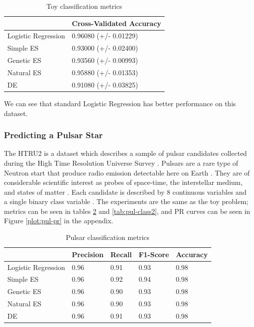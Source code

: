 \documentclass[conference]{IEEEtran}
\begin{document}
\begin{table}[htbp]
\centering
\begin{tabular}{ll}
\hline
 & Cross-Validated Accuracy \\ \hline
Logistic Regression & 0.96080 (+/- 0.01229) \\
Simple ES & 0.93000 (+/- 0.02400) \\
Genetic ES & 0.93560 (+/- 0.00993) \\
Natural ES & 0.95880 (+/- 0.01353) \\
DE & 0.91080 (+/- 0.03825) \\ \hline
\end{tabular}
\caption{Toy classification metrics}
\label{tab:toy-class2}
\end{table}

We can see that standard Logistic Regression has better performance on this dataset.

\subsubsection{Predicting a Pulsar Star}
The HTRU2 is a dataset which describes a sample of pulsar candidates collected during the High Time Resolution Universe Survey \cite{pulsar}. 
Pulsars are a rare type of Neutron start that produce radio emission detectable here on Earth \cite{pulsar}. They are of considerable scientific 
interest as probes of space-time, the interstellar medium, and states of matter \cite{pulsar}. Each candidate is described by $8$ continuous 
variables and a single binary class variable \cite{pulsar}. The experiments are the same as the toy problem; metrics can be seen in tables 
\ref{tab:pul-class1} and \ref{tab:pul-class2}, and PR curves can be seen in Figure \ref{plot:pul-pr} in the appendix.

\begin{table}[htbp]
\centering
\begin{tabular}{@{}lllll@{}}
\toprule
 & Precision & Recall & F1-Score & Accuracy \\ \midrule
Logistic Regression & \cellcolor[HTML]{C0C0C0}0.96 & 0.91 & 0.93 & \cellcolor[HTML]{C0C0C0}0.98 \\
Simple ES & \cellcolor[HTML]{C0C0C0}0.96 & \cellcolor[HTML]{C0C0C0}0.92 & \cellcolor[HTML]{C0C0C0}0.94 & \cellcolor[HTML]{C0C0C0}0.98 \\
Genetic ES & \cellcolor[HTML]{C0C0C0}0.96 & 0.90 & 0.93 & \cellcolor[HTML]{C0C0C0}0.98 \\
Natural ES & \cellcolor[HTML]{C0C0C0}0.96 & 0.90 & 0.93 & \cellcolor[HTML]{C0C0C0}0.98 \\
DE & \cellcolor[HTML]{C0C0C0}0.96 & 0.91 & 0.93 & \cellcolor[HTML]{C0C0C0}0.98 \\ \bottomrule
\end{tabular}
\caption{Pulsar classification metrics}
\label{tab:pul-class1}
\end{table}
\end{document}
